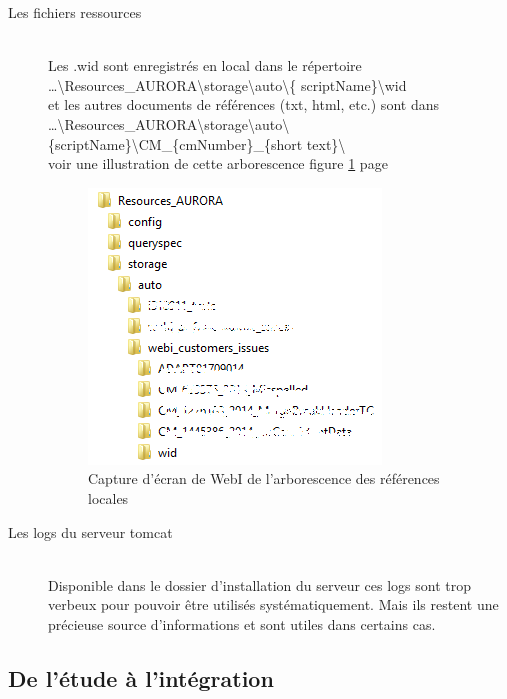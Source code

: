 \begin{description}
\item[Les fichiers ressources] \hfill \\
Les .wid sont enregistr\'{e}s en local dans le répertoire \\ \ldots\textbackslash{}Resources\_AURORA\textbackslash{}storage\textbackslash{}auto\textbackslash{}\{ scriptName\}\textbackslash{}wid\\
et les autres documents de r\'{e}f\'{e}rences (txt, html, etc.) sont dans \\ \ldots\textbackslash{}Resources\_AURORA\textbackslash{}storage\textbackslash{}auto\textbackslash{}\{scriptName\}\textbackslash{}CM\_\{cmNumber\}\_\{short text\}\textbackslash{}\\ 
voir une illustration de cette arborescence figure \ref{figure:localSavedReferences} page \pageref{figure:localSavedReferences}
\begin{figure}[!ht]
  \centering
      \includegraphics{images/localSavedReferences.png}
  \caption{Capture d'\'{e}cran de WebI de l'arborescence des r\'{e}f\'{e}rences locales}
	\label{figure:localSavedReferences}
\end{figure}
\item[Les logs du serveur tomcat] \hfill \\
Disponible dans le dossier d'installation du serveur ces logs sont trop verbeux pour pouvoir \^{e}tre utilisés systématiquement. Mais ils restent une précieuse source d'informations et sont utiles dans certains cas.
\end{description}





\subsection{De l'\'{e}tude \`{a} l'int\'{e}gration}

